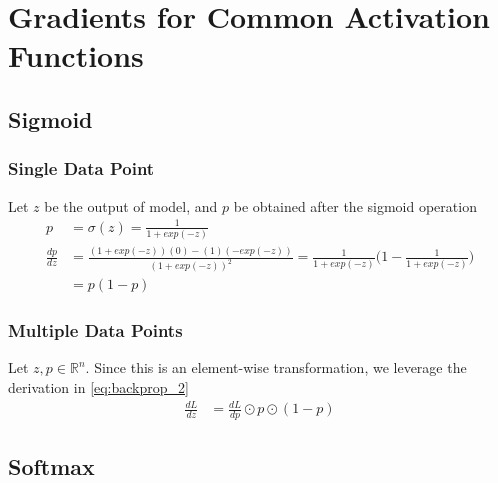 \documentclass[../../deep_learning_notes.tex]{subfiles}
\begin{document}
\section{Gradients for Common Activation Functions}
\subsection{Sigmoid}
\subsubsection*{Single Data Point}
Let $z$ be the output of model, and $p$ be obtained after the sigmoid operation
\begin{align*}
    p &= \sigma(z) = \frac{1}{1 + exp(-z)}\\
    \frac{dp}{dz} &= \frac{(1 + exp(-z))(0) - (1)(-exp(-z))}{(1 + exp(-z))^{2}} = \frac{1}{1 + exp(-z)} \bigg(1 - \frac{1}{1 + exp(-z)} \bigg)\\
    &= p(1-p)
\end{align*}


\subsubsection*{Multiple Data Points}
Let $z,p \in \mathbb{R}^{n}$. Since this is an element-wise transformation, we leverage the derivation in \eqref{eq:backprop_2} 
\begin{align*}
    \frac{dL}{dz} &= \frac{dL}{dp}\odot p\odot (1-p)
\end{align*}

\subsection{Softmax}
\end{document}
